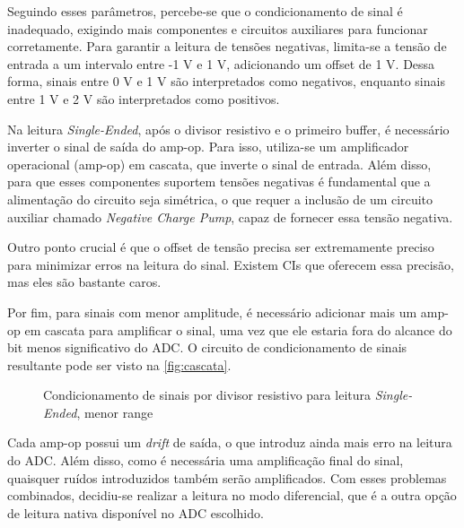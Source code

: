 Seguindo esses parâmetros, percebe-se que o condicionamento de sinal é inadequado, exigindo mais componentes e circuitos auxiliares para funcionar corretamente. Para garantir a leitura de tensões negativas, limita-se a tensão de entrada a um intervalo entre -1 V e 1 V, adicionando um offset de 1 V. Dessa forma, sinais entre 0 V e 1 V são interpretados como negativos, enquanto sinais entre 1 V e 2 V são interpretados como positivos.

Na leitura \textit{Single-Ended}, após o divisor resistivo e o primeiro buffer, é necessário inverter o sinal de saída do \gls{amp-op}. Para isso, utiliza-se um amplificador operacional (amp-op) em cascata, que inverte o sinal de entrada. Além disso, para que esses componentes suportem tensões negativas é fundamental que a alimentação do circuito seja simétrica, o que requer a inclusão de um circuito auxiliar chamado \textit{Negative Charge Pump}, capaz de fornecer essa tensão negativa.

Outro ponto crucial é que o offset de tensão precisa ser extremamente preciso para minimizar erros na leitura do sinal. Existem \gls{CI}s que oferecem essa precisão, mas eles são bastante caros.

Por fim, para sinais com menor amplitude, é necessário adicionar mais um amp-op em cascata para amplificar o sinal, uma vez que ele estaria fora do alcance do bit menos significativo do \gls{ADC}. O circuito de condicionamento de sinais resultante pode ser visto na \autoref{fig:cascata}.

\begin{figure}[htb!]
    \caption{Condicionamento de sinais por divisor resistivo para leitura \textit{Single-Ended}, menor range}
    \vspace*{5mm}
    \label{fig:cascata}
    \fonte{}
\end{figure}

Cada amp-op possui um \textit{drift} de saída, o que introduz ainda mais erro na leitura do \gls{ADC}. Além disso, como é necessária uma amplificação final do sinal, quaisquer ruídos introduzidos também serão amplificados. Com esses problemas combinados, decidiu-se realizar a leitura no modo diferencial, que é a outra opção de leitura nativa disponível no \gls{ADC} escolhido.

